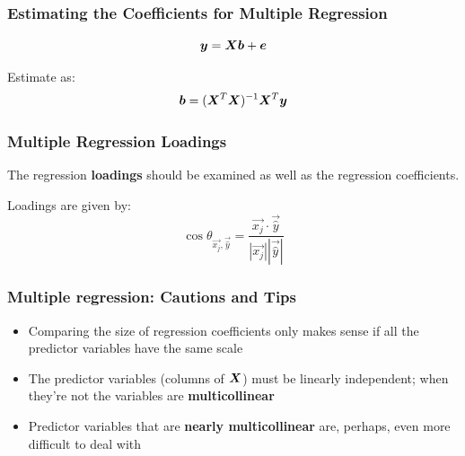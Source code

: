 \documentclass{beamer}
\begin{document}
\begin{frame}
  \frametitle{Estimating the Coefficients for Multiple Regression}


$$
\bm{y} = \bm{X}\bm{b} + \bm{e}
$$
\bigskip

Estimate  as:
$$
\bm{b} = (\bm{X}^T \bm{X})^{-1}\bm{X}^T\bm{y}
$$

\end{frame}
\begin{frame}
  \frametitle{Multiple Regression Loadings}


The regression \textbf{loadings} should be examined as well as the regression coefficients.

\begin{center}
\end{center}

Loadings are given by:
		\[
		\cos \theta_{\vec{x_j},\vec{\widehat{y}}} = \frac{\vec{x_j} \cdot \vec{\widehat{y}}}{|\vec{x_j}||\vec{\widehat{y}}|}
		\]


\end{frame}




\begin{frame}
  \frametitle{Multiple regression: Cautions and Tips}


\begin{itemize}
    \item Comparing the size of regression coefficients only makes sense if all the predictor variables have the same scale
	\item The predictor variables  (columns of $\bm{X}$) must be linearly independent; when they're not the variables are \textbf{multicollinear}
	\item Predictor variables that are \textbf{nearly multicollinear} are, perhaps, even more difficult to deal with
\end{itemize}

\end{frame}

\end{document}
